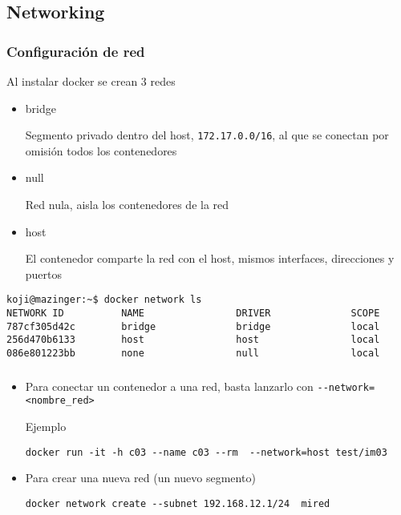 \documentclass[ucs]{beamer}
\begin{document}
\subsection{Networking}
\begin{frame}[fragile]
\frametitle{Configuración de red}
Al instalar docker se crean 3 redes 
\begin{itemize}
\item
bridge

Segmento privado dentro del host,
\verb|172.17.0.0/16|,
 al que se
conectan por omisión todos los contenedores

\item
null

Red nula, aisla los contenedores de la red

\item
host

El contenedor comparte la red con el host, mismos interfaces,
direcciones y puertos
\end{itemize}

  \begin{scriptsize}
  \begin{verbatim}
koji@mazinger:~$ docker network ls
NETWORK ID          NAME                DRIVER              SCOPE
787cf305d42c        bridge              bridge              local
256d470b6133        host                host                local
086e801223bb        none                null                local
  \end{verbatim}
  \end{scriptsize}
\end{frame}




\begin{frame}[fragile]
\frametitle{}
\begin{itemize}
\item
Para conectar un contenedor a una red, basta lanzarlo con
\verb|--network=<nombre_red>|

Ejemplo

  \begin{footnotesize}
  \begin{verbatim}
docker run -it -h c03 --name c03 --rm  --network=host test/im03
  \end{verbatim}
  \end{footnotesize}

\item
Para crear una nueva red (un nuevo segmento)

  \begin{footnotesize}
  \begin{verbatim}
docker network create --subnet 192.168.12.1/24  mired
  \end{verbatim}
  \end{footnotesize}
\end{itemize}

\end{frame}
\end{document}
